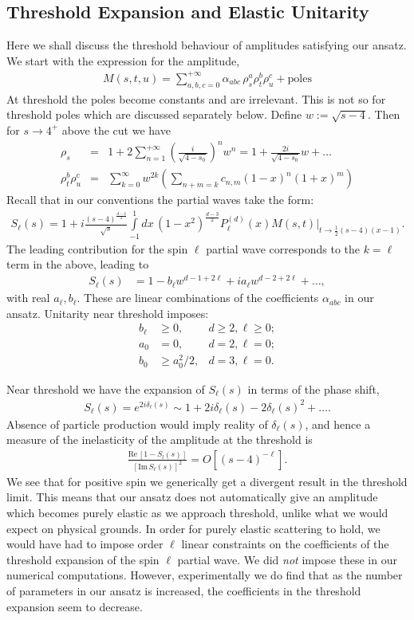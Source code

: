 \documentclass[12pt]{article}
\newcommand{\begBvR}[1]{\begin{#1}}
\newcommand{\bea}{\begBvR{eqnarray}}
\newcommand{\eea}{\end{eqnarray}}
\newcommand{\<}{{\langle}}
\renewcommand{\>}{{\rangle}}
\begin{document}
\subsection{Threshold Expansion and Elastic Unitarity}
\label{app:thresholds}
Here we shall discuss the threshold behaviour of amplitudes satisfying our ansatz. We start with the expression for the amplitude,
\bea
M(s,t,u)=\sum_{a,b,c=0}^{+\infty}\alpha_{a b c}\, \rho_s^a \rho_t^b \rho_u^c +\mbox{poles}
\eea
At threshold the poles become constants and are irrelevant. This is not so for threshold poles which are discussed separately below. Define $w:=\sqrt{s-4}$.  Then for $s\to 4^+$ above the cut we have
\begin{subequations}
\bea 
\rho_s&=&1+2\sum_{n=1}^{+\infty} \left(\frac{i}{\sqrt{4-s_0}}\right)^n w^n=1+\frac{2 i}{\sqrt{4-s_0}} w+\ldots\\
\rho_t^b \rho_u^c
&=& \sum_{k=0}^{\infty}w^{2k} \left(\sum_{n+m=k} c_{n,m}  (1-x)^n (1+x)^m\right)
\eea
\end{subequations}
Recall that in our conventions the partial waves take the form:
\bea
S_{\ell}(s)=1+i \frac{(s-4)^\frac{d-2}{2}}{ \sqrt{s}}   \int\limits_{-1}^1\! dx\, (1-x^2)^{\frac{d-3}{2}}P^{(d)}_\ell(x) \left. M(s, t)\right|_{t\to \tfrac{1}{2}(s-4) (x-1)}.
\eea
The leading contribution for the spin $\ell$ partial wave corresponds to the $k=\ell$ term in the above, leading to
\bea
S_\ell(s)&=1-b_\ell w^{d-1+2\ell}+i a_\ell w^{d-2+2\ell} +\ldots,  
\eea
with real $a_{\ell},b_\ell$. These are linear combinations of the coefficients $\alpha_{abc}$ in our ansatz. Unitarity near threshold imposes: 
\begin{subequations}
\begin{align}
b_\ell&\geq 0, &d\geq 2,\ell\geq 0; \\
a_0&=0, &d=2, \ell=0;\\
b_0&\geq a_0^2/2, &d=3, \ell=0.
\end{align}
\end{subequations}

Near threshold we have the expansion of $S_{\ell}(s)$ in terms of the phase shift,
\bea
S_{\ell}(s)=e^{2 i \delta_\ell(s)}\sim 1+2i \delta_{\ell}(s)-2 \delta_{\ell}(s)^2+\ldots.
\eea
Absence of particle production would imply reality of $\delta_{\ell}(s)$, and hence a measure of the inelasticity of the amplitude at the threshold is
\bea
\frac{\mbox{Re}\, [1-S_l(s)]}{\left[\mbox{Im}\, S_\ell(s)\right]^2} =  O[(s-4)^{-\ell}].
\eea
We see that for positive spin we generically get a divergent result in the threshold limit. This means that our ansatz does not automatically give an amplitude which becomes purely elastic as we approach threshold, unlike what we would expect on physical grounds. In order for purely elastic scattering to hold, we would have had to impose order $\ell$ linear constraints on the coefficients of the threshold expansion of the spin $\ell$ partial wave. We did {\it not} impose these in our numerical computations. However, experimentally we do find that as the number of parameters in our ansatz is increased, the coefficients in the threshold expansion seem to decrease.
\end{document}

